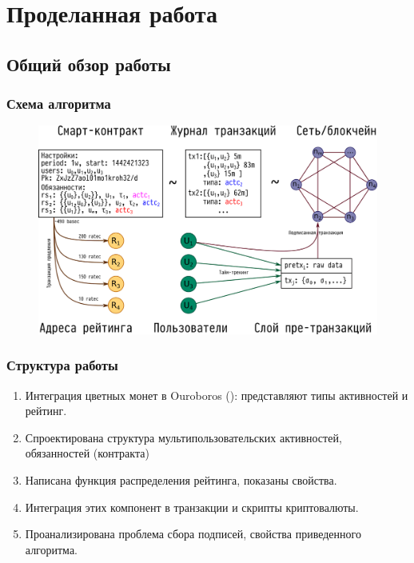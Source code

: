 \documentclass[11pt,handout,pdf,hyperref={unicode}]{beamer}
\begin{document}
\section{Проделанная работа}

\subsection{Общий обзор работы}

\begin{frame}
  \frametitle{Схема алгоритма}
  \begin{figure}[t]
  \includegraphics{presentation_big_scheme}
  \centering
  \end{figure}

\end{frame}

\begin{frame}
  \frametitle{Структура работы}

  \begin{enumerate}
  \item Интеграция цветных монет в Ouroboros (\parencite{ouroboros}): представляют типы
    активностей и рейтинг.
  \item Спроектирована структура мультипользовательских активностей,
    обязанностей (контракта)
  \item Написана функция распределения рейтинга, показаны свойства.
  \item Интеграция этих компонент в транзакции и скрипты криптовалюты.
  \item Проанализирована проблема сбора подписей, свойства
    приведенного алгоритма.
  \end{enumerate}

\end{frame}
\end{document}
